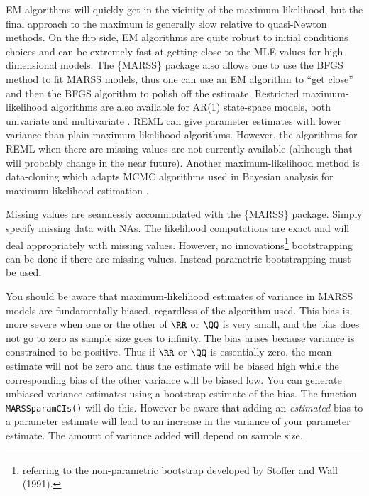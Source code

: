 EM algorithms will quickly get in the vicinity of the maximum likelihood, but the final approach to the maximum is generally slow relative to quasi-Newton methods.  On the flip side, EM algorithms are quite robust to initial conditions choices and can be extremely fast at getting close to the MLE values for high-dimensional models.  The \{MARSS\} package also allows one to use the BFGS method to fit MARSS models, thus one can use an EM algorithm to ``get close'' and then the BFGS algorithm to polish off the estimate. Restricted maximum-likelihood algorithms are also available for AR(1) state-space models, both univariate \citep{Staplesetal2004} and multivariate \citep{HinrichsenHolmes2009}.  REML can give parameter estimates with lower variance than plain maximum-likelihood algorithms.  However, the algorithms for REML when there are missing values are not currently available (although that will probably change in the near future).  Another maximum-likelihood method is data-cloning which adapts MCMC algorithms used in Bayesian analysis for maximum-likelihood estimation \citep{Leleetal2007}.  

Missing values are seamlessly accommodated with the \{MARSS\} package.  Simply specify missing data with NAs.  The likelihood computations are exact and will deal appropriately with missing values.  However, no innovations\footnote{referring to the non-parametric bootstrap developed by Stoffer and Wall (1991).} bootstrapping can be done if there are missing values.  Instead parametric bootstrapping must be used.

You should be aware that maximum-likelihood estimates of variance in MARSS models are fundamentally biased, regardless of the algorithm used.  This bias is more severe when one or the other of $\RR$ or $\QQ$ is very small, and the bias does not go to zero as sample size goes to infinity.  The bias arises because variance is constrained to be positive.  Thus if $\RR$ or $\QQ$ is essentially zero, the mean estimate will not be zero and thus the estimate  will be biased high while the corresponding bias of the other variance will be biased low.  You can generate unbiased variance estimates using a bootstrap estimate of the bias.  The function \texttt{MARSSparamCIs()} will do this.  However be aware that adding an {\it estimated} bias to a parameter estimate will lead to an increase in the variance of your parameter estimate.  The amount of variance added will depend on sample size.

